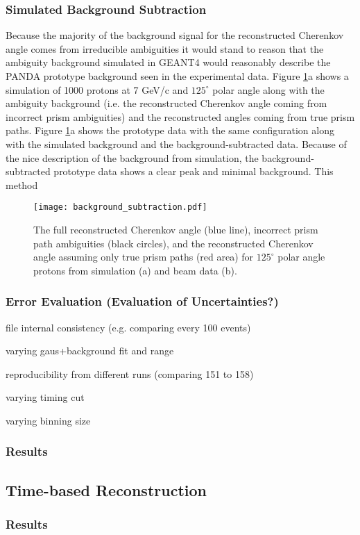 \subsubsection{Simulated Background Subtraction}
Because the majority of the background signal for the reconstructed Cherenkov angle comes from irreducible ambiguities it would stand to reason that the ambiguity background simulated in GEANT4 would reasonably describe the PANDA prototype background seen in the experimental data. Figure \ref{fig:background_sub}a shows a simulation of 1000 protons at 7 GeV/c and $125^\circ$ polar angle along with the ambiguity background (i.e. the reconstructed Cherenkov angle coming from incorrect prism ambiguities) and the reconstructed angles coming from true prism paths. Figure \ref{fig:background_sub}a shows the prototype data with the same configuration along with the simulated background and the background-subtracted data. Because of the nice description of the background from simulation, the background-subtracted prototype data shows a clear peak and minimal background. This method 

\begin{figure}[!htb]
	\centering
	\texttt{[image: background\_subtraction.pdf]}
	\caption{The full reconstructed Cherenkov angle (blue line), incorrect prism path ambiguities (black circles), and the reconstructed Cherenkov angle assuming only true prism paths (red area) for $125^\circ$ polar angle protons from simulation (a) and beam data (b).}
	\label{fig:background_sub}
\end{figure}

\subsubsection{Error Evaluation (Evaluation of Uncertainties?)}
file internal consistency (e.g. comparing every 100 events)

varying gaus+background fit and range

reproducibility from different runs (comparing 151 to 158)

varying timing cut

varying binning size

\subsubsection{Results}

\subsection{Time-based Reconstruction}

\subsubsection{Results}
